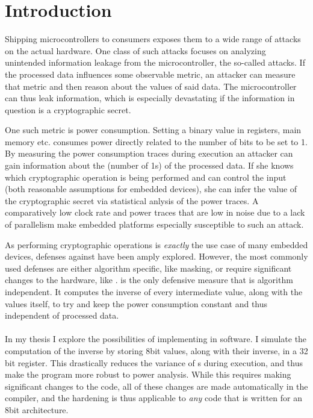 \section{Introduction}
Shipping microcontrollers to consumers exposes them to a wide range of attacks on the actual hardware.
One class of such attacks focuses on analyzing unintended information leakage from the microcontroller, the so-called \sidechannel{} attacks.
If the processed data influences some observable metric, an attacker can measure that metric and then reason about the values of said data.
The microcontroller can thus leak information, which is especially devastating if the information in question is a cryptographic secret.

One such metric is power consumption.
Setting a binary value in registers, main memory etc. consumes power directly related to the number of bits to be set to 1.
By measuring the power consumption traces during execution an attacker can gain information about the \hammingw{} (number of 1s) of the processed data.
If she knows which cryptographic operation is being performed and can control the input (both reasonable assumptions for embedded devices), she can infer the value of the cryptographic secret via statistical anlysis of the power traces.
A comparatively low clock rate and power traces that are low in noise due to a lack of parallelism make embedded platforms especially susceptible to such an attack.

As performing cryptographic operations is \emph{exactly} the use case of many embedded devices, defenses against \poweranalysis{} have been amply explored.
However, the most commonly used defenses are either algorithm specific, like masking, or require significant changes to the hardware, like \dual{}.
\dual{} is the only defensive measure that is algorithm independent.
It computes the inverse of every intermediate value, along with the values itself, to try and keep the power consumption constant and thus independent of processed data.
\\
\\
In my thesis I explore the possibilities of implementing \dual{} in software.
I simulate the computation of the inverse by storing 8bit values, along with their inverse, in a 32 bit register.
This drastically reduces the variance of \hammingw{}s during execution, and thus make the program more robust to power analysis.
While this requires making significant changes to the code, all of these changes are made automatically in the compiler, and the hardening is thus applicable to \emph{any} code that is written for an 8bit architecture.

